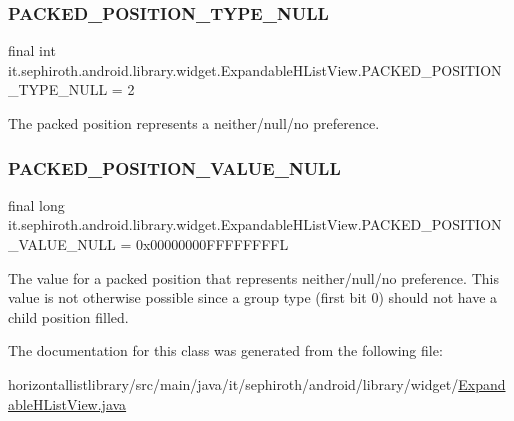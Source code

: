 \subsubsection{\texorpdfstring{P\+A\+C\+K\+E\+D\+\_\+\+P\+O\+S\+I\+T\+I\+O\+N\+\_\+\+T\+Y\+P\+E\+\_\+\+N\+U\+LL}{PACKED\_POSITION\_TYPE\_NULL}}
{\footnotesize\ttfamily final int it.\+sephiroth.\+android.\+library.\+widget.\+Expandable\+H\+List\+View.\+P\+A\+C\+K\+E\+D\+\_\+\+P\+O\+S\+I\+T\+I\+O\+N\+\_\+\+T\+Y\+P\+E\+\_\+\+N\+U\+LL = 2\hspace{0.3cm}{\ttfamily [static]}}

The packed position represents a neither/null/no preference. \mbox{\label{classit_1_1sephiroth_1_1android_1_1library_1_1widget_1_1_expandable_h_list_view_a625409dd43a10f9bee03a2fa43d5243a}} 
\subsubsection{\texorpdfstring{P\+A\+C\+K\+E\+D\+\_\+\+P\+O\+S\+I\+T\+I\+O\+N\+\_\+\+V\+A\+L\+U\+E\+\_\+\+N\+U\+LL}{PACKED\_POSITION\_VALUE\_NULL}}
{\footnotesize\ttfamily final long it.\+sephiroth.\+android.\+library.\+widget.\+Expandable\+H\+List\+View.\+P\+A\+C\+K\+E\+D\+\_\+\+P\+O\+S\+I\+T\+I\+O\+N\+\_\+\+V\+A\+L\+U\+E\+\_\+\+N\+U\+LL = 0x00000000\+F\+F\+F\+F\+F\+F\+F\+FL\hspace{0.3cm}{\ttfamily [static]}}

The value for a packed position that represents neither/null/no preference. This value is not otherwise possible since a group type (first bit 0) should not have a child position filled. 

The documentation for this class was generated from the following file\+:\begin{DoxyCompactItemize}
\item 
horizontallistlibrary/src/main/java/it/sephiroth/android/library/widget/\hyperlink{_expandable_h_list_view_8java}{Expandable\+H\+List\+View.\+java}\end{DoxyCompactItemize}
